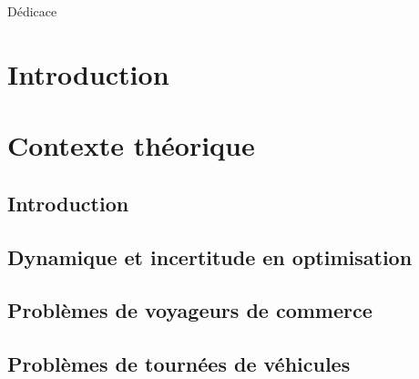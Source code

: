 \documentclass[
a4paper,
11pt,
twoside,
onecolumn,
openright,      %
leqno,          %
final   %
]{phdlasl}
\begin{document}
   	

	

	\begin{Dedicace}
	 Dédicace
	\end{Dedicace}

	

	\tableofcontents

	\chapter*{Introduction}\label{chapitre:introduction}
	
	
	\chapter{Contexte théorique}\label{chapitre:art}

	\section*{Introduction}\label{partie:art-introduction}
	
	
	\section{Dynamique et incertitude en optimisation}\label{partie:art-Incertitude}
	

	\section{Problèmes de voyageurs de commerce}\label{part:art-TSP}
	

	\section{Problèmes de tournées de véhicules}\label{partie:art-VRP}
	
\end{document}
